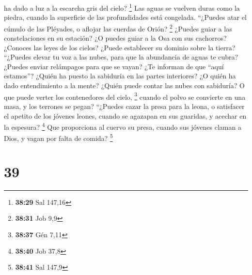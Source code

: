 ha dado a luz a la escarcha gris del cielo? \footnote{\textbf{38:29} Sal
  147,16}  Las aguas se vuelven duras como la piedra,
cuando la superficie de las profundidades está congelada.
 ``¿Puedes atar el cúmulo de las Pléyades, o aflojar las
cuerdas de Orión? \footnote{\textbf{38:31} Job 9,9} 
¿Puedes guiar a las constelaciones en su estación? ¿O puedes guiar a la
Osa con sus cachorros?  ¿Conoces las leyes de los cielos?
¿Puede establecer su dominio sobre la tierra?  ``¿Puedes
elevar tu voz a las nubes, para que la abundancia de aguas te cubra?
 ¿Puedes enviar relámpagos para que se vayan? ¿Te
informan de que ``aquí estamos''?  ¿Quién ha puesto la
sabiduría en las partes interiores? ¿O quién ha dado entendimiento a la
mente?  ¿Quién puede contar las nubes con sabiduría? O
que puede verter los contenedores del cielo, \footnote{\textbf{38:37}
  Gén 7,11}  cuando el polvo se convierte en una masa, y
los terrones se pegan?  ``¿Puedes cazar la presa para la
leona, o satisfacer el apetito de los jóvenes leones, 
cuando se agazapan en sus guaridas, y acechar en la espesura?
\footnote{\textbf{38:40} Job 37,8}  Que proporciona al
cuervo su presa, cuando sus jóvenes claman a Dios, y vagan por falta de
comida? \footnote{\textbf{38:41} Sal 147,9}

\hypertarget{section-38}{%
\section{39}\label{section-38}}

